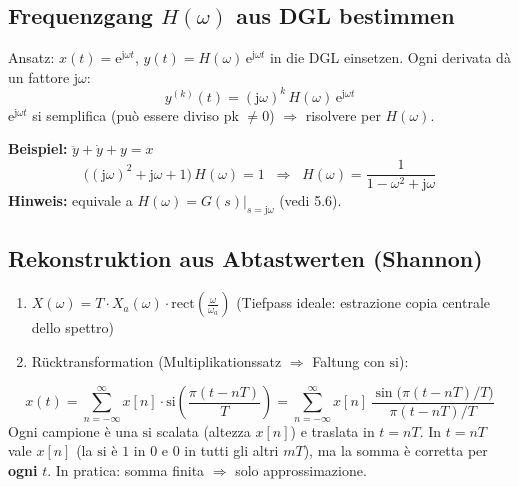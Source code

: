 \subsection[Frequenzgang H(w) aus DGL bestimmen]{Frequenzgang $H(\omega)$ aus DGL bestimmen}
Ansatz: $x(t)=\mathrm{e}^{\mathrm{j}\omega t}$, \; $y(t)=H(\omega)\,\mathrm{e}^{\mathrm{j}\omega t}$
in die DGL einsetzen. Ogni derivata dà un fattore $\mathrm{j}\omega$:
\[
y^{(k)}(t) = (\mathrm{j}\omega)^k\, H(\omega)\,\mathrm{e}^{\mathrm{j}\omega t}
\]
$\mathrm{e}^{\mathrm{j}\omega t}$ si semplifica (può essere diviso pk $\neq 0$) \quad $\Rightarrow$ \quad risolvere per $H(\omega)$.

\smallbreak

\textbf{Beispiel:} \; $\ddot y + \dot y + y = x$
\[
\big((\mathrm{j}\omega)^2 + \mathrm{j}\omega + 1\big)\,H(\omega) = 1
\;\;\Rightarrow\;\;
H(\omega) = \frac{1}{1-\omega^2+\mathrm{j}\omega}
\]
\textbf{Hinweis:} equivale a $H(\omega)=G(s)\big|_{s=\mathrm{j}\omega}$ (vedi 5.6).

\subsection{Rekonstruktion aus Abtastwerten (Shannon)}
\begin{enumerate}
    \item $X(\omega) = T \cdot X_a(\omega) \cdot \mathrm{rect}\!\left(\frac{\omega}{\omega_a}\right)$ \quad (Tiefpass ideale: estrazione copia centrale dello spettro)
    \item Rücktransformation (Multiplikationssatz $\Rightarrow$ Faltung con $\mathrm{si}$):
\end{enumerate}
\[
x(t) = \sum_{n=-\infty}^{\infty} x[n] \cdot \mathrm{si}\!\left(\frac{\pi (t - nT)}{T}\right)
= \sum_{n=-\infty}^{\infty} x[n] \, \frac{\sin\!\big(\pi (t - nT)/T\big)}{\pi (t - nT)/T}
\]
Ogni campione è una $\mathrm{si}$ scalata (altezza $x[n]$) e traslata in $t = nT$. In $t = nT$ vale $x[n]$ (la $\mathrm{si}$ è $1$ in $0$ e $0$ in tutti gli altri $mT$), ma la somma è corretta per \textbf{ogni} $t$. In pratica: somma finita $\Rightarrow$ solo approssimazione.